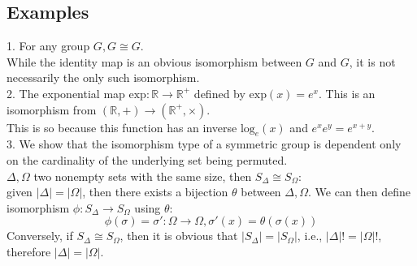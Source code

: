 \documentclass{article}
\begin{document}
\subsection{Examples}
\begin{addmargin}[1em]{0em}
1. For any group $G, G \cong G$.\\
While the identity map is an obvious isomorphism between $G$ and $G$, it is not necessarily the only such isomorphism.\\
2. The exponential map $\textrm{exp}: \mathbb{R} \rightarrow \mathbb{R}^+$ defined by $\textrm{exp}(x) = e^x$. This is an isomorphism from $(\mathbb{R}, +) \rightarrow (\mathbb{R}^+, \times)$.\\
This is so because this function has an inverse $\textrm{log}_e(x)$ and $e^xe^y = e^{x+y}$.\\
3. We show that the isomorphism type of a symmetric group is dependent only on the cardinality of the underlying set being permuted.\\
$\Delta, \Omega$ two nonempty sets with the same size, then $S_{\Delta} \cong S_{\Omega}$:\\
given $|\Delta| = |\Omega|$, then there exists a bijection $\theta$ between $\Delta, \Omega$. We can then define isomorphism $\phi: S_{\Delta} \rightarrow S_{\Omega}$ using $\theta$:
\begin{equation*}
    \phi(\sigma) = \sigma': \Omega \rightarrow \Omega, \sigma'(x) = \theta(\sigma(x))
\end{equation*}
Conversely, if $S_{\Delta} \cong S_{\Omega}$, then it is obvious that $|S_{\Delta}| = |S_{\Omega}|$, i.e., $|\Delta|! = |\Omega|!$, therefore $|\Delta| = |\Omega|$.\\
\end{addmargin}
\end{document}

